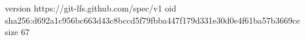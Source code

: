version https://git-lfs.github.com/spec/v1
oid sha256:d692a1c956bc663d43c8bccd5f79fbba447f179d331e30d0e4f61ba57b3669ce
size 67
